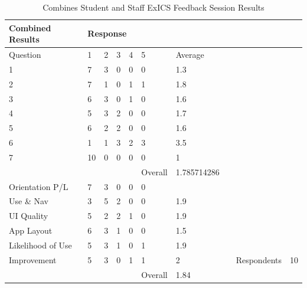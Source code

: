 \begin{table}[h]
\centering
\begin{tabular}{|l|l|l|l|l|l|l|l|ll|}
\hline
Combined Results  & \multicolumn{9}{l}{Response}                       \\
\hline
Question          & 1  & 2 & 3 & 4 & 5 & Average &  &             &    \\
\hline
1                 & 7  & 3 & 0 & 0 & 0 & 1.3     &  &             &    \\
2                 & 7  & 1 & 0 & 1 & 1 & 1.8     &  &             &    \\
3                 & 6  & 3 & 0 & 1 & 0 & 1.6     &  &             &    \\
4                 & 5  & 3 & 2 & 0 & 0 & 1.7     &  &             &    \\
5                 & 6  & 2 & 2 & 0 & 0 & 1.6     &  &             &    \\
6                 & 1  & 1 & 3 & 2 & 3 & 3.5     &  &             &    \\
7                 & 10 & 0 & 0 & 0 & 0 & 1       &  &             &    \\
\hline
                  &   &   &   &   & Overall  & 1.785714286 &  &   &   \\
\hline
Orientation P/L   & 7  & 3 & 0 & 0 & 0 &         &  &             &    \\
Use \& Nav        & 3  & 5 & 2 & 0 & 0 & 1.9     &  &             &    \\
UI Quality        & 5  & 2 & 2 & 1 & 0 & 1.9     &  &             &    \\
App Layout        & 6  & 3 & 1 & 0 & 0 & 1.5     &  &             &    \\
Likelihood of Use & 5  & 3 & 1 & 0 & 1 & 1.9     &  &             &    \\
Improvement       & 5  & 3 & 0 & 1 & 1 & 2       &  & Respondents & 10 \\
\hline
                  &   &   &   &   & Overall  & 1.84 &  &          &   \\
\hline
\end{tabular}
\caption{Combines Student and Staff ExICS Feedback Session Results}
\label{tab:combined_results}
\end{table}

\FloatBarrier

